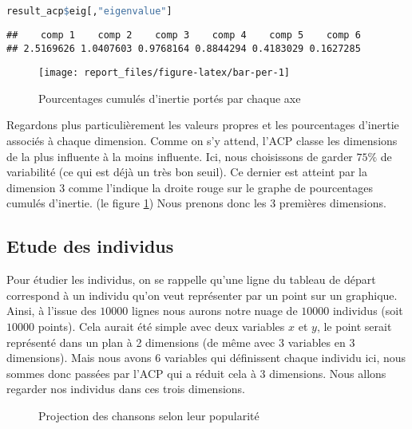 \documentclass[
  11pt,
  xcolor = usenames,dvipsnames]{article}
\begin{document}
\begin{lstlisting}[language=R]
result_acp$eig[,"eigenvalue"]
\end{lstlisting}

\begin{lstlisting}
##    comp 1    comp 2    comp 3    comp 4    comp 5    comp 6 
## 2.5169626 1.0407603 0.9768164 0.8844294 0.4183029 0.1627285
\end{lstlisting}

\begin{figure}

{\centering \texttt{[image: report\_files/figure-latex/bar-per-1]} 

}

\caption{Pourcentages cumulés d'inertie portés par chaque axe}\label{fig:bar-per}
\end{figure}

Regardons plus particulièrement les valeurs propres et les pourcentages d'inertie associés à chaque dimension.
Comme on s'y attend, l'ACP classe les dimensions de la plus influente à la moins influente.
Ici, nous choisissons de garder \(75\%\) de variabilité (ce qui est déjà un très bon seuil).
Ce dernier est atteint par la dimension 3 comme l'indique la droite rouge sur le graphe de pourcentages cumulés d'inertie. (le figure \ref{fig:bar-per})
Nous prenons donc les 3 premières dimensions.

\hypertarget{etude-des-individus}{%
\subsection{Etude des individus}\label{etude-des-individus}}

Pour étudier les individus, on se rappelle qu'une ligne du tableau de départ correspond à un individu qu'on veut représenter par un point sur un graphique.
Ainsi, à l'issue des \(10000\) lignes nous aurons notre nuage de \(10000\) individus (soit \(10000\) points). Cela aurait été simple avec deux variables \(x\) et \(y\),
le point serait représenté dans un plan à 2 dimensions (de même avec 3 variables en 3 dimensions).
Mais nous avons 6 variables qui définissent chaque individu ici, nous sommes donc passées par l'ACP qui a réduit cela à 3 dimensions. Nous
allons regarder nos individus dans ces trois dimensions.

\begin{figure}

{\centering {}

}

\caption{Projection des chansons selon leur popularité}\label{fig:projection-pop-12-13}
\end{figure}
\end{document}
